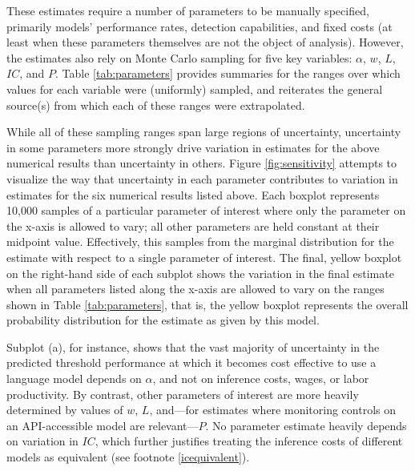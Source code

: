 \documentclass{article}
\begin{document}
These estimates require a number of parameters to be manually specified, primarily models' performance rates, detection capabilities, and fixed costs (at least when these parameters themselves are not the object of analysis). However, the estimates also rely on Monte Carlo sampling for five key variables: $\alpha$, $w$, $L$, $IC$, and $P$. Table \ref{tab:parameters} provides summaries for the ranges over which values for each variable were (uniformly) sampled, and reiterates the general source(s) from which each of these ranges were extrapolated. 

While all of these sampling ranges span large regions of uncertainty, uncertainty in some parameters more strongly drive variation in estimates for the above numerical results than uncertainty in others. Figure \ref{fig:sensitivity} attempts to visualize the way that uncertainty in each parameter contributes to variation in estimates for the six numerical results listed above. Each boxplot represents 10,000 samples of a particular parameter of interest where only the parameter on the x-axis is allowed to vary; all other parameters are held constant at their midpoint value. Effectively, this samples from the marginal distribution for the estimate with respect to a single parameter of interest. The final, yellow boxplot on the right-hand side of each subplot shows the variation in the final estimate when all parameters listed along the x-axis are allowed to vary on the ranges shown in Table \ref{tab:parameters}, that is, the yellow boxplot represents the overall probability distribution for the estimate as given by this model.

Subplot (a), for instance, shows that the vast majority of uncertainty in the predicted threshold performance at which it becomes cost effective to use a language model depends on $\alpha$, and not on inference costs, wages, or labor productivity. By contrast, other parameters of interest are more heavily determined by values of $w$, $L$, and—for estimates where monitoring controls on an API-accessible model are relevant—$P$. No parameter estimate heavily depends on variation in $IC$, which further justifies treating the inference costs of different models as equivalent (see footnote \ref{icequivalent}).
\end{document}
